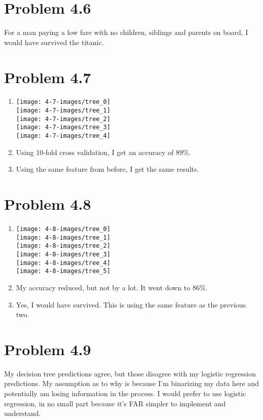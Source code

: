 \documentclass{article}
\begin{document}
\section*{Problem 4.6}
For a man paying a low fare with no children, siblings and parents on board, I would have survived the titanic.

\section*{Problem 4.7}
\begin{enumerate}[label=(\alph*)]
  \item 
  \texttt{[image: 4-7-images/tree\_0]} \\
  \texttt{[image: 4-7-images/tree\_1]} \\
  \texttt{[image: 4-7-images/tree\_2]} \\
  \texttt{[image: 4-7-images/tree\_3]} \\
  \texttt{[image: 4-7-images/tree\_4]}
  \item Using 10-fold cross validation, I get an accuracy of 89\%.
  \item Using the same feature from before, I get the same results.
\end{enumerate}

\section*{Problem 4.8}
\begin{enumerate}[label=(\alph*)]
  \item
  \texttt{[image: 4-8-images/tree\_0]} \\
  \texttt{[image: 4-8-images/tree\_1]} \\
  \texttt{[image: 4-8-images/tree\_2]} \\
  \texttt{[image: 4-8-images/tree\_3]} \\
  \texttt{[image: 4-8-images/tree\_4]} \\
  \texttt{[image: 4-8-images/tree\_5]}
  \item My accuracy reduced, but not by a lot. It went down to 86\%.
  \item Yes, I would have survived. This is using the same feature as the previous two.
\end{enumerate}

\section*{Problem 4.9}
My decision tree predictions agree, but those disagree with my logistic regression predictions. My assumption as to why is because I'm binarizing my data here and potentially am losing information in the process. I would prefer to use logistic regression, in no small part because it's FAR simpler to implement and understand.
\end{document}
